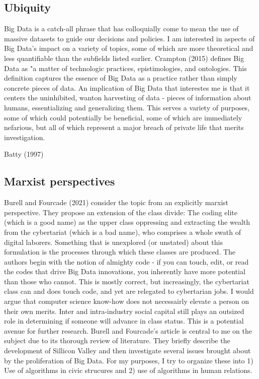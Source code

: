 \subsection{Ubiquity}
Big Data is a catch-all phrase that has colloquially come to mean the
use of massive datasets to guide our decisions and policies. I am
interested in aspects of Big Data's impact on a variety of topics,
some of which are more theoretical and less quantifiable than the
subfields listed earlier. Crampton (2015) defines Big Data as "a
matter of technologic practices, epistimologies, and ontologies. This
definition captures the essence of Big Data as a practice rather than
simply concrete pieces of data. An implication of Big Data that
interestes me is that it centers the uninhibited, wanton harvesting of
data - pieces of information about humans, essentializing and
generalizing them. This serves a variety of purposes, some of which
could potentially be beneficial, some of which are immediately
nefarious, but all of which represent a major breach of private life
that merits investigation.

Batty (1997)


\subsection{Marxist perspectives}
Burell and Fourcade (2021) consider the topic from an explicitly
marxist perspective. They propose an extension of the class divide:
The coding elite (which is a good name) as the upper class oppressing
and extracting the wealth from the cybertariat (which is a bad name),
who comprises a whole swath of digital laborers. Something that is
unexplored (or unstated) about this formulation is the processes
through which these classes are produced. The authors begin with the
notion of almighty code - if you can touch, edit, or read the codes
that drive Big Data innovations, you inherently have more potential
than those who cannot. This is mostly correct, but increasingly, the
cybertariat class can and does touch code, and yet are relegated to
cybertarian jobs. I would argue that computer science know-how does
not necessairly elevate a person on their own merits. Inter and
intra-industry social capital still plays an outsized role in
determining if someone will advance in class status. This is a
potential avenue for further research.  Burell and Fourcade's article
is central to me on the subject due to its thorough review of
literature. They briefly describe the development of Sillicon Valley
and then investigate several issues brought about by the proliferation
of Big Data. For my purposes, I try to organize these into 1) Use of
algorithms in civic strucures and 2) use of algorithms in human
relations.

